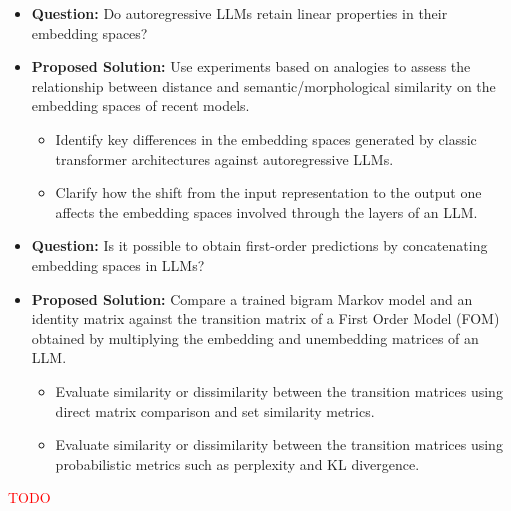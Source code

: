 \documentclass[aspectratio=169, 12pt]{beamer}
\begin{document}
    \begin{frame}{}
        \begin{itemize}[<+|visible@+->]
            \item<1-1> \textbf{Question:} Do autoregressive LLMs retain linear properties in their embedding spaces?
            \item<2-4> \textbf{Proposed Solution:} Use experiments based on analogies to assess the relationship between distance and semantic/morphological similarity on the embedding spaces of recent models.
            \begin{itemize}[<+|visible@+->]
                \item<3-3> Identify key differences in the embedding spaces generated by classic transformer architectures against autoregressive LLMs.
                \item<4-4> Clarify how the shift from the input representation to the output one affects the embedding spaces involved through the layers of an LLM.
            \end{itemize}
        \end{itemize}
    \end{frame}

    \begin{frame}{}
        \begin{itemize}[<+|visible@+->]
            \item<1-1> \textbf{Question:} Is it possible to obtain first-order predictions by concatenating embedding spaces in LLMs?
            \item<2-4> \textbf{Proposed Solution:} Compare a trained bigram Markov model and an identity matrix against the transition matrix of a First Order Model (FOM) obtained by multiplying the embedding and unembedding matrices of an LLM.
            \begin{itemize}[<+|visible@+->]
                \item<3-3> Evaluate similarity or dissimilarity between the transition matrices using direct matrix comparison and set similarity metrics.
                \item<4-4> Evaluate similarity or dissimilarity between the transition matrices using probabilistic metrics such as perplexity and KL divergence.
            \end{itemize}
        \end{itemize}
    \end{frame}

    \begin{frame}{}
        \textcolor{red}{TODO}
    \end{frame}
\end{document}
